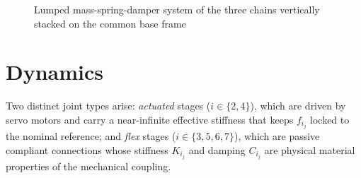 \begin{figure}[htbp]
\caption{Lumped mass-spring-damper system of the three chains vertically stacked on the common base frame}
\label{fig:litho_model_full}
\end{figure}

\section{Dynamics}\label{sec:model_dynamics}

Two distinct joint types arise: \emph{actuated} stages ($i \in \{2,4\}$), which are driven by servo motors and carry a near-infinite effective stiffness that keeps $f_{i_j}$ locked to the nominal reference; and \emph{flex} stages ($i \in \{3,5,6,7\}$), which are passive compliant connections whose stiffness $K_{i_j}$ and damping $C_{i_j}$ are physical material properties of the mechanical coupling.

